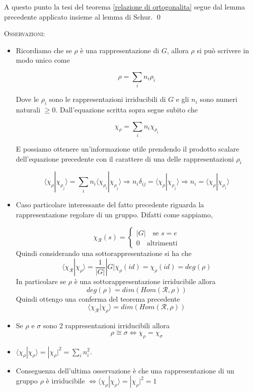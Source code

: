 \documentclass[11pt]{article}
\theoremstyle{plain}
\theoremstyle{definition}
\theoremstyle{remark}
\newcommand{\dsum}{\displaystyle\sum}
\begin{document}
A questo punto la tesi del teorema \ref{relazione di ortogonalita} segue dal lemma precedente applicato insieme al lemma di Schur. \qed


\textsc{Osservazioni:}

\begin{itemize}
\item Ricordiamo che se $\rho$ è una rappresentazione di $G$, allora $\rho$ si può scrivere in modo unico come 

\[ \rho = \dsum_i n_i \rho_i\]

Dove le $\rho_i$ sono le rappresentazioni irriducibili di $G$ e gli $n_i$ sono numeri naturali $\geq 0$. Dall'equazione scritta sopra segue subito che

\[ \chi_\rho = \dsum_i n_i \chi_{\rho_i}\]

E possiamo ottenere un'informazione utile prendendo il prodotto scalare dell'equazione precedente con il carattere di una delle rappresentazioni $\rho_i$

\[ \langle \chi_\rho | \chi_{\rho_j} \rangle = \dsum_i n_i \langle \chi_{\rho_i} | \chi_{\rho_j} \rangle \Rightarrow n_i \delta_{ij} = \langle \chi_\rho | \chi_{\rho_j} \rangle \Rightarrow n_i = \langle \chi_\rho | \chi_{\rho_i} \rangle\]

\item Caso particolare interessante del fatto precedente riguarda la rappresentazione regolare di un gruppo. Difatti come sappiamo,

\[ \chi_{\mathcal{R}}(s) = 
\begin{cases}
|G| \quad \text{se } s = e \\
0 \quad \text{altrimenti}
\end{cases}\]
Quindi considerando una sottorappresentazione  si ha che 
\[
\langle \chi_{\mathcal{R}} | \chi_\rho \rangle = \frac{1}{|G|}|G|\chi_{\rho}(id)=\chi_{\rho}(id)=deg(\rho)
\]
In particolare se $\rho$ è una sottorappresentazione irriducibile allora
\[ deg(\rho)=dim(Hom(\mathcal{R},\rho)) \]
Quindi ottengo una conferma del teorema precedente 
\[      
\langle \chi_{\mathcal{R}} | \chi_\rho \rangle =dim(Hom(\mathcal{R},\rho))
\]

\item Se $\rho$ e $\sigma$ sono 2 rappresentazioni irriducibili allora $$\rho \cong \sigma \Leftrightarrow \chi_{\rho}=\chi_{\sigma}$$

\item $\langle \chi_\rho | \chi_\rho \rangle = |\chi_\rho|^2 = \sum_i n_i^2$.
\item Conseguenza dell'ultima osservazione è che una rappresentazione di un gruppo $\rho$ è irriducibile $\Leftrightarrow \langle \chi_\rho | \chi_\rho \rangle = |\chi_\rho|^2 = 1$ 


\end{itemize}
\end{document}
